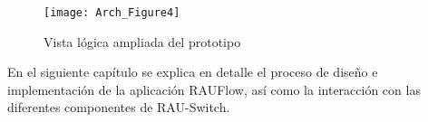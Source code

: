 
\newpage
\begin{figure}[ht!] 
\centering    
\texttt{[image: Arch\_Figure4]}
\caption[Vista l\'ogica ampliada del prototipo]{Vista l\'ogica ampliada del prototipo}
\label{fig:OpenSourceRArch4}
\end{figure}

En el siguiente cap\'itulo se explica en detalle el proceso de diseño e implementaci\'on de la aplicaci\'on RAUFlow, as\'i como la interacci\'on con las diferentes componentes de RAU-Switch.
